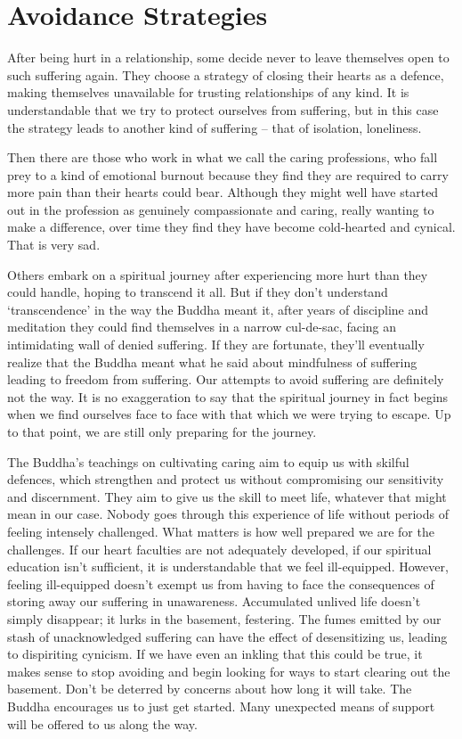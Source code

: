 \section{Avoidance Strategies}

After being hurt in a relationship, some decide never to leave
themselves open to such suffering again. They choose a strategy of
closing their hearts as a defence, making themselves unavailable for
trusting relationships of any kind. It is understandable that we try to
protect ourselves from suffering, but in this case the strategy leads to
another kind of suffering – that of isolation, loneliness.

Then there are those who work in what we call the caring professions,
who fall prey to a kind of emotional burnout because they find they are
required to carry more pain than their hearts could bear. Although they
might well have started out in the profession as genuinely compassionate
and caring, really wanting to make a difference, over time they find
they have become cold-hearted and cynical. That is very sad.

Others embark on a spiritual journey after experiencing more hurt than
they could handle, hoping to transcend it all. But if they don’t
understand ‘transcendence’ in the way the Buddha meant it, after years
of discipline and meditation they could find themselves in a narrow
cul-de-sac, facing an intimidating wall of denied suffering. If they are
fortunate, they’ll eventually realize that the Buddha meant what he said
about mindfulness of suffering leading to freedom from suffering. Our
attempts to avoid suffering are definitely not the way. It is no
exaggeration to say that the spiritual journey in fact begins when we
find ourselves face to face with that which we were trying to escape. Up
to that point, we are still only preparing for the journey.

The Buddha’s teachings on cultivating caring aim to equip us with
skilful defences, which strengthen and protect us without compromising
our sensitivity and discernment. They aim to give us the skill to meet
life, whatever that might mean in our case. Nobody goes through this
experience of life without periods of feeling intensely challenged. What
matters is how well prepared we are for the challenges. If our heart
faculties are not adequately developed, if our spiritual education isn’t
sufficient, it is understandable that we feel ill-equipped. However,
feeling ill-equipped doesn’t exempt us from having to face the
consequences of storing away our suffering in unawareness. Accumulated
unlived life doesn’t simply disappear; it lurks in the basement,
festering. The fumes emitted by our stash of unacknowledged suffering
can have the effect of desensitizing us, leading to dispiriting
cynicism. If we have even an inkling that this could be true, it makes
sense to stop avoiding and begin looking for ways to start clearing out
the basement. Don’t be deterred by concerns about how long it will take.
The Buddha encourages us to just get started. Many unexpected means of
support will be offered to us along the way.

